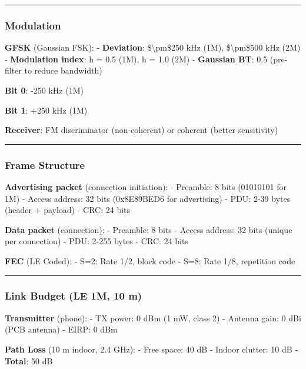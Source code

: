 \begin{center}\rule{0.5\linewidth}{0.5pt}\end{center}

\subsubsection{Modulation}\label{modulation}

\textbf{GFSK} (Gaussian FSK): - \textbf{Deviation}:
\$\textbackslash pm\$250 kHz (1M), \$\textbackslash pm\$500 kHz (2M) -
\textbf{Modulation index}: h = 0.5 (1M), h = 1.0 (2M) - \textbf{Gaussian
BT}: 0.5 (pre-filter to reduce bandwidth)

\textbf{Bit 0}: -250 kHz (1M)

\textbf{Bit 1}: +250 kHz (1M)

\textbf{Receiver}: FM discriminator (non-coherent) or coherent (better
sensitivity)

\begin{center}\rule{0.5\linewidth}{0.5pt}\end{center}

\subsubsection{Frame Structure}\label{frame-structure-2}

\textbf{Advertising packet} (connection initiation): - Preamble: 8 bits
(01010101 for 1M) - Access address: 32 bits (0x8E89BED6 for advertising)
- PDU: 2-39 bytes (header + payload) - CRC: 24 bits

\textbf{Data packet} (connection): - Preamble: 8 bits - Access address:
32 bits (unique per connection) - PDU: 2-255 bytes - CRC: 24 bits

\textbf{FEC} (LE Coded): - S=2: Rate 1/2, block code - S=8: Rate 1/8,
repetition code

\begin{center}\rule{0.5\linewidth}{0.5pt}\end{center}

\subsubsection{Link Budget (LE 1M, 10 m)}\label{link-budget-le-1m-10-m}

\textbf{Transmitter} (phone): - TX power: 0 dBm (1 mW, class 2) -
Antenna gain: 0 dBi (PCB antenna) - EIRP: 0 dBm

\textbf{Path Loss} (10 m indoor, 2.4 GHz): - Free space: 40 dB - Indoor
clutter: 10 dB - \textbf{Total}: 50 dB

